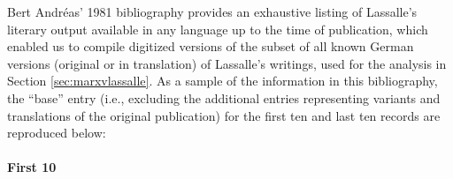 Bert Andréas' 1981 bibliography \parencite{andreas_ferdinand_1981} provides an exhaustive listing of Lassalle's literary output available in any language up to the time of publication, which enabled us to compile digitized versions of the subset of all known German versions (original or in translation) of Lassalle's writings, used for the analysis in Section \ref{sec:marxvlassalle}. As a sample of the information in this bibliography, the ``base'' entry (i.e., excluding the additional entries representing variants and translations of the original publication) for the first ten and last ten records are reproduced below:

\paragraph{First 10}

